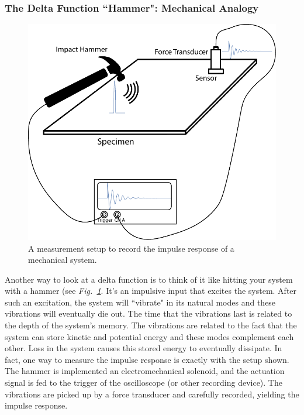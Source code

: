\subsubsection{The Delta Function ``Hammer":  Mechanical Analogy}
\begin{figure}[tb]
\centering
\includegraphics[width=.5\columnwidth]{hammer_resonance}
\caption{A measurement setup to record the impulse response of a mechanical system. }
\label{fig:hammer_setup}
\end{figure}
Another way to look at a delta function is to think of it like hitting your system with a hammer (see \emph{Fig.~\ref{fig:hammer_setup}}.  It's an impulsive input that excites the system.  After such an excitation, the system will ``vibrate" in its natural modes and these vibrations will eventually die out.  The time that the vibrations last is related to the depth of the system's memory.  The vibrations are related to the fact that the system can store kinetic and potential energy and these modes complement each other.  Loss in the system causes this stored energy to eventually dissipate.  In fact, one way to measure the impulse response is exactly with the setup shown.  The hammer is implemented an electromechanical solenoid, and the actuation signal is fed to the trigger of the oscilloscope (or other recording device).  The vibrations are picked up by a force transducer and carefully recorded, yielding the impulse response.     
